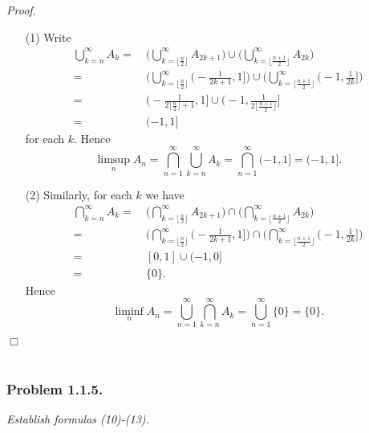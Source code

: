 \documentclass{article}
\begin{document}
\emph{Proof.}
\begin{enumerate}
\item[(1)]
  Write
  \begin{align*}
    \bigcup_{k=n}^{\infty} A_k
    =
    & \:
      \Bigg( \bigcup_{k=\lfloor \frac{n}{2} \rfloor}^{\infty} A_{2k+1} \Bigg) \cup
      \Bigg( \bigcup_{k=\lfloor \frac{n+1}{2} \rfloor}^{\infty} A_{2k} \Bigg) \\
    =
    & \:
      \Bigg( \bigcup_{k=\lfloor \frac{n}{2} \rfloor}^{\infty} \bigg( -\frac{1}{2k+1},1 \bigg] \Bigg)
      \cup
      \Bigg( \bigcup_{k=\lfloor \frac{n+1}{2} \rfloor}^{\infty} \bigg( -1, \frac{1}{2k} \bigg] \Bigg) \\
    =
    & \:
      \bigg( -\frac{1}{2\lfloor \frac{n}{2} \rfloor+1},1 \bigg]
      \cup
      \bigg( -1, \frac{1}{2\lfloor \frac{n+1}{2} \rfloor} \bigg] \\
    =
    & \:
      (-1, 1]
  \end{align*}
  for each $k$.
  Hence
  \[
    \limsup_n A_n
    = \bigcap_{n=1}^{\infty} \bigcup_{k=n}^{\infty} A_k
    = \bigcap_{n=1}^{\infty} (-1, 1]
    = (-1, 1].
  \]

\item[(2)]
  Similarly, for each $k$ we have
  \begin{align*}
    \bigcap_{k=n}^{\infty} A_k
    =
    & \:
      \Bigg( \bigcap_{k=\lfloor \frac{n}{2} \rfloor}^{\infty} A_{2k+1} \Bigg) \cap
      \Bigg( \bigcap_{k=\lfloor \frac{n+1}{2} \rfloor}^{\infty} A_{2k} \Bigg) \\
    =
    & \:
      \Bigg( \bigcap_{k=\lfloor \frac{n}{2} \rfloor}^{\infty} \bigg( -\frac{1}{2k+1},1 \bigg] \Bigg)
      \cap
      \Bigg( \bigcap_{k=\lfloor \frac{n+1}{2} \rfloor}^{\infty} \bigg( -1, \frac{1}{2k} \bigg] \Bigg) \\
    =
    & \:
      [0,1] \cup (-1,0] \\
    =
    & \:
      \{ 0 \}.
  \end{align*}
  Hence
  \[
    \liminf_n A_n
    = \bigcup_{n=1}^{\infty} \bigcap_{k=n}^{\infty} A_k
    = \bigcup_{n=1}^{\infty} \{ 0 \}
    = \{ 0 \}.
  \]
\end{enumerate}
$\Box$ \\\\






\subsubsection*{Problem 1.1.5.}
\emph{Establish formulas (10)-(13).} \\
\end{document}
